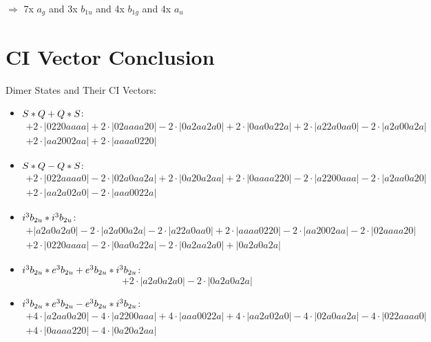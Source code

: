 \documentclass{article}
\begin{document}
$\Rightarrow{}$ 7x $a_{g}$ and 3x $b_{1u}$ and 4x $b_{1g}$ and 4x $a_{u}$


\newpage
\section{CI Vector Conclusion} 
Dimer States and Their CI Vectors:
\begin{itemize}
\item \boldmath$S * Q + Q * S \displaystyle $\unboldmath : \quad$$\begin{array}{c}
+2 \cdot \left|0220aaaa\right| +2 \cdot \left|02aaaa20\right| -2 \cdot \left|0a2aa2a0\right| +2 \cdot \left|0aa0a22a\right| +2 \cdot \left|a22a0aa0\right| -2 \cdot \left|a2a00a2a\right| \\[0.5cm] +2 \cdot \left|aa2002aa\right| +2 \cdot \left|aaaa0220\right|
\end{array}$$
\item \boldmath$S * Q - Q * S \displaystyle $\unboldmath : \quad$$\begin{array}{c}
+2 \cdot \left|022aaaa0\right| -2 \cdot \left|02a0aa2a\right| +2 \cdot \left|0a20a2aa\right| +2 \cdot \left|0aaaa220\right| -2 \cdot \left|a2200aaa\right| -2 \cdot \left|a2aa0a20\right| \\[0.5cm] +2 \cdot \left|aa2a02a0\right| -2 \cdot \left|aaa0022a\right|
\end{array}$$
\item \boldmath$i^3 b_{2u} * i^3 b_{2u} \displaystyle $\unboldmath : \quad$$\begin{array}{c}
+\left|a2a0a2a0\right| -2 \cdot \left|a2a00a2a\right| -2 \cdot \left|a22a0aa0\right| +2 \cdot \left|aaaa0220\right| -2 \cdot \left|aa2002aa\right| -2 \cdot \left|02aaaa20\right| \\[0.5cm] +2 \cdot \left|0220aaaa\right| -2 \cdot \left|0aa0a22a\right| -2 \cdot \left|0a2aa2a0\right| +\left|0a2a0a2a\right|
\end{array}$$
\item \boldmath$i^3 b_{2u} * e^3 b_{2u} + e^3 b_{2u} * i^3 b_{2u} \displaystyle $\unboldmath : \quad$$+2 \cdot \left|a2a0a2a0\right| -2 \cdot \left|0a2a0a2a\right|$$
\item \boldmath$i^3 b_{2u} * e^3 b_{2u} - e^3 b_{2u} * i^3 b_{2u} \displaystyle $\unboldmath : \quad$$\begin{array}{c}
+4 \cdot \left|a2aa0a20\right| -4 \cdot \left|a2200aaa\right| +4 \cdot \left|aaa0022a\right| +4 \cdot \left|aa2a02a0\right| -4 \cdot \left|02a0aa2a\right| -4 \cdot \left|022aaaa0\right| \\[0.5cm] +4 \cdot \left|0aaaa220\right| -4 \cdot \left|0a20a2aa\right|

\end{array}$$
\end{itemize}
\end{document}
